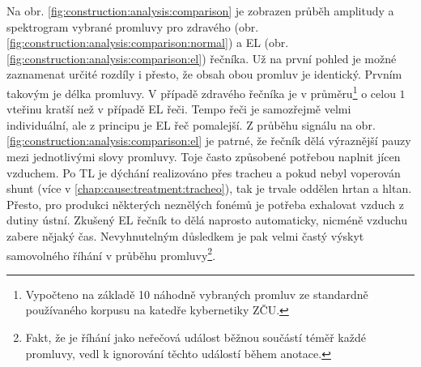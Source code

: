 Na obr. \ref{fig:construction:analysis:comparison} je zobrazen průběh amplitudy a spektrogram vybrané promluvy pro zdravého (obr. \ref{fig:construction:analysis:comparison:normal}) a EL (obr. \ref{fig:construction:analysis:comparison:el}) řečníka. Už na první pohled je možné zaznamenat určité rozdíly i přesto, že obsah obou promluv je identický. Prvním takovým je délka promluvy. V případě zdravého řečníka je v průměru\footnote{Vypočteno na základě 10 náhodně vybraných promluv ze standardně používaného korpusu na katedře kybernetiky ZČU.} o celou $1$ vteřinu kratší než v případě EL řeči. Tempo řeči je samozřejmě velmi individuální, ale z principu je EL řeč pomalejší. Z průběhu signálu na obr. \ref{fig:construction:analysis:comparison:el} je patrné, že řečník dělá výraznější pauzy mezi jednotlivými slovy promluvy. Toje často způsobené potřebou naplnit jícen vzduchem. Po TL je dýchání realizováno přes tracheu a pokud nebyl voperován shunt (více v \ref{chap:cause:treatment:tracheo}), tak je trvale oddělen hrtan a hltan. Přesto, pro produkci některých neznělých fonémů je potřeba exhalovat vzduch z dutiny ústní. Zkušený EL řečník to dělá naprosto automaticky, nicméně  vzduchu zabere nějaký čas. Nevyhnutelným důsledkem je pak velmi častý výskyt samovolného říhání v průběhu promluvy\footnote{Fakt, že je říhání jako neřečová událost běžnou součástí téměř každé promluvy, vedl k ignorování těchto událostí během anotace.}.

